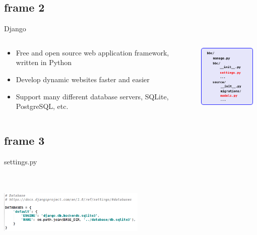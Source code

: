 \documentclass[xcolor=x11names,compress]{beamer}
\renewcommand{\(}{\begin{columns}}
\renewcommand{\)}{\end{columns}}
\newcommand{\<}[1]{\begin{column}{#1}}
\renewcommand{\>}{\end{column}}
\begin{document}
\subsection{frame 2}
\begin{frame}{Django}

\begin{columns}[T]
 \begin{column}{.6\textwidth}
  \begin{block}{}
    \begin{itemize}
     \item Free and open source web application framework, written in Python
     \item Develop dynamic websites faster and easier
     \item Support many different database servers, SQLite, PostgreSQL, etc.
    \end{itemize}
  \end{block}
 \end{column}
 \begin{column}{.4\textwidth}
  \begin{block}{}
   \includegraphics[width=4cm, height=3cm]{images/structure1.png}
  \end{block}
 \end{column}
\end{columns}

\end{frame}

\subsection{frame 3}
\begin{frame}{settings.py}
  \begin{block}{}
   \includegraphics[width=7cm, height=4cm]{images/dbsettings.png}
  \end{block}
\end{frame}
\end{document}
